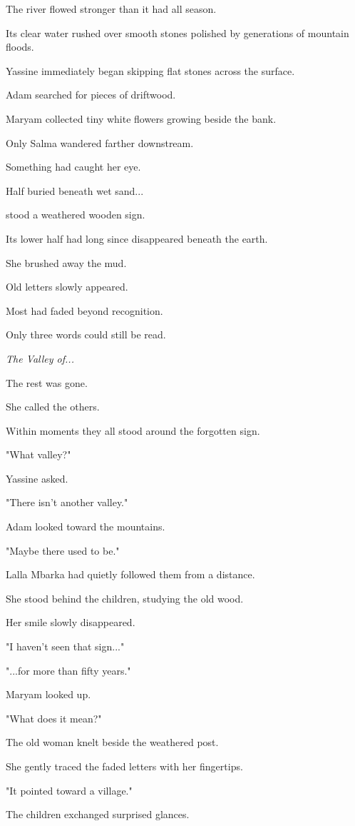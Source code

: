 \documentclass[12pt,openany]{book}
\begin{document}
The river flowed stronger than it had all season.

Its clear water rushed over smooth stones polished by generations of mountain floods.

Yassine immediately began skipping flat stones across the surface.

Adam searched for pieces of driftwood.

Maryam collected tiny white flowers growing beside the bank.

Only Salma wandered farther downstream.

Something had caught her eye.

Half buried beneath wet sand...

stood a weathered wooden sign.

Its lower half had long since disappeared beneath the earth.

She brushed away the mud.

Old letters slowly appeared.

Most had faded beyond recognition.

Only three words could still be read.

\emph{The Valley of...}

The rest was gone.

She called the others.

Within moments they all stood around the forgotten sign.

"What valley?"

Yassine asked.

"There isn't another valley."

Adam looked toward the mountains.

"Maybe there used to be."

Lalla Mbarka had quietly followed them from a distance.

She stood behind the children, studying the old wood.

Her smile slowly disappeared.

"I haven't seen that sign..."

"...for more than fifty years."

Maryam looked up.

"What does it mean?"

The old woman knelt beside the weathered post.

She gently traced the faded letters with her fingertips.

"It pointed toward a village."

The children exchanged surprised glances.
\end{document}
